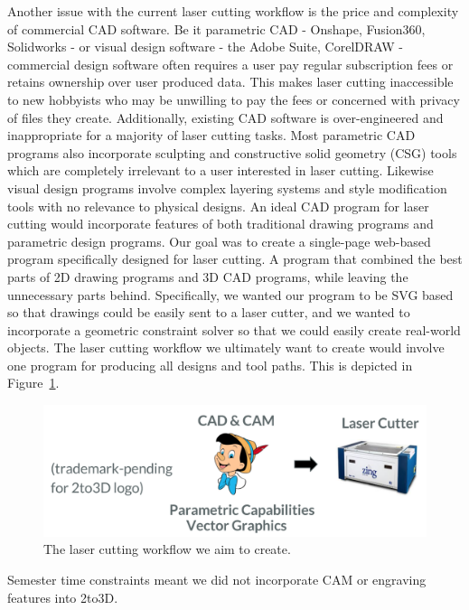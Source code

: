 Another issue with the current laser cutting workflow is the price and complexity of commercial CAD software. Be it parametric CAD - Onshape, Fusion360, Solidworks - or visual design software - the Adobe Suite, CorelDRAW - commercial design software often requires a user pay regular subscription fees or retains ownership over user produced data. This makes laser cutting inaccessible to new hobbyists who may be unwilling to pay the fees or concerned with privacy of files they create. Additionally, existing CAD software is over-engineered and inappropriate for a majority of laser cutting tasks. Most parametric CAD programs also incorporate sculpting and constructive solid geometry (CSG) tools which are completely irrelevant to a user interested in laser cutting. Likewise visual design programs involve complex layering systems and style modification tools with no relevance to physical designs. An ideal CAD program for laser cutting would incorporate features of both traditional drawing programs and parametric design programs. Our goal was to create a single-page web-based program specifically designed for laser cutting. A program that combined the best parts of 2D drawing programs and 3D CAD programs, while leaving the unnecessary parts behind. Specifically, we wanted our program to be SVG based so that drawings could be easily sent to a laser cutter, and we wanted to incorporate a geometric constraint solver so that we could easily create real-world objects. The laser cutting workflow we ultimately want to create would involve one program for producing all designs and tool paths. This is depicted in Figure~\ref{fig:2to3DWorkflow}.

\begin{figure}[h]
  \includegraphics[width=\linewidth]{2to3DWorkflow.jpg}
  \caption{The laser cutting workflow we aim to create.}
  \label{fig:2to3DWorkflow}
\end{figure}

Semester time constraints meant we did not incorporate CAM or engraving features into 2to3D.